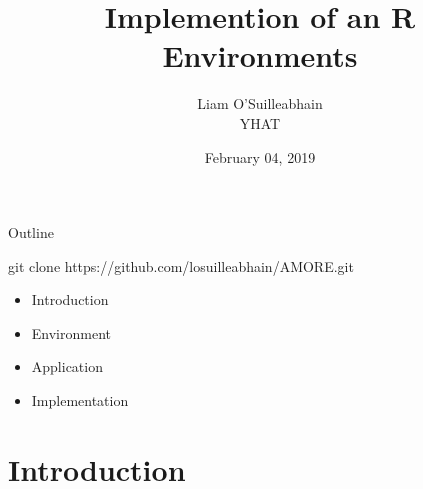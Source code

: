\documentclass{beamer}
\title{Implemention of an R Environments}
\author{Liam O'Suilleabhain\\ \bigskip YHAT}
\date{February 04, 2019}
\begin{document}
\frame{\titlepage}




\begin{frame}{Outline}
\begin{center}git clone https://github.com/losuilleabhain/AMORE.git \end{center}
\bigskip
\begin{itemize}
\item Introduction\\
\item Environment\\
\item Application\\
\item Implementation\\
\end{itemize}
\end{frame}

\section*{Introduction}
\end{document}
